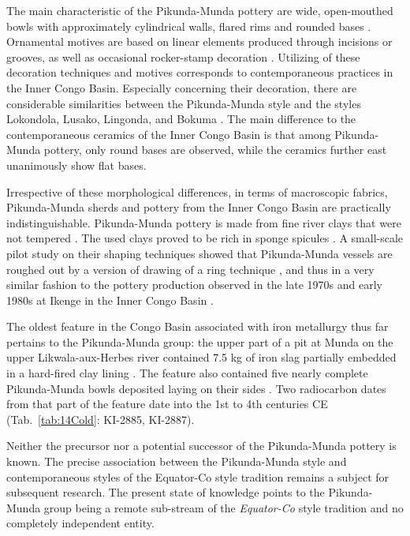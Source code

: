 \documentclass[smallextended,natbib]{svjour3}       %
\begin{document}
The main characteristic of the Pikunda-Munda pottery are wide, open-mouthed bowls with approximately cylindrical walls, flared rims and rounded bases \citep[Fig.~\ref{fig:sangha}.3;][311--314]{Eggert.1993}. Ornamental motives are based on linear elements produced through incisions or grooves, as well as occasional rocker-stamp decoration \citep[362 Appendix 4.12]{Seidensticker.2021e}. Utilizing of these decoration techniques and motives corresponds to contemporaneous practices in the Inner Congo Basin. Especially concerning their decoration, there are considerable similarities between the Pikunda-Munda style and the styles Lokondola, Lusako, Lingonda, and Bokuma \citep[107]{Wotzka.1995}. The main difference to the contemporaneous ceramics of the Inner Congo Basin is that among Pikunda-Munda pottery, only round bases are observed, while the ceramics further east unanimously show flat bases.

Irrespective of these morphological differences, in terms of macroscopic fabrics, Pikunda-Munda sherds and pottery from the Inner Congo Basin are practically indistinguishable. Pikunda-Munda pottery is made from fine river clays that were not tempered \citep[66--67 Fig.~21]{Seidensticker.2021e}. The used clays proved to be rich in sponge spicules \citep{Seidensticker.2020}. A small-scale pilot study on their shaping techniques showed that Pikunda-Munda vessels are roughed out by a version of drawing of a ring technique \citep[47--51 Fig.~13; 72--73 Tab.~13]{Seidensticker.2021e}, and thus in a very similar fashion to the pottery production observed in the late 1970s and early 1980s at Ikenge in the Inner Congo Basin \citep{Eggert.1980c}.

The oldest feature in the Congo Basin associated with iron metallurgy thus far pertains to the Pikunda-Munda group: the upper part of a pit at Munda on the upper Likwala-aux-Herbes river contained 7.5 kg of iron slag partially embedded in a hard-fired clay lining \citep[321--330]{Seidensticker.2021e}. The feature also contained five nearly complete Pikunda-Munda bowls deposited laying on their sides \citep[323 Fig.~157.A--E; Pl.~91.1--5]{Seidensticker.2021e}. Two radiocarbon dates from that part of the feature date into the 1st to 4th centuries CE (Tab.~\ref{tab:14Cold}: KI-2885, KI-2887).

Neither the precursor nor a potential successor of the Pikunda-Munda pottery is known. The precise association between the Pikunda-Munda style and contemporaneous styles of the Equator-Co style tradition remains a subject for subsequent research. The present state of knowledge points to the Pikunda-Munda group being a remote sub-stream of the \textit{Equator-Co} style tradition and no completely independent entity.
\end{document}
